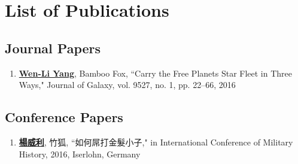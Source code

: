 \chapter*{List of Publications}


\section*{Journal Papers}
\begin{spacing}{1}
\begin{enumerate}

\item {\bf \underline{Wen-Li Yang}}, Bamboo Fox, ``Carry the Free Planets Star Fleet in Three Ways," Journal of Galaxy, vol. 9527, no. 1, pp. 22--66, 2016

\end{enumerate}
\end{spacing}


\section*{Conference Papers}
\begin{spacing}{1}
\begin{enumerate}

\item {\bf \underline{楊威利}}, 竹狐, ``如何屌打金髮小子," in International Conference of Military History, 2016, Iserlohn, Germany

\end{enumerate}
\end{spacing}